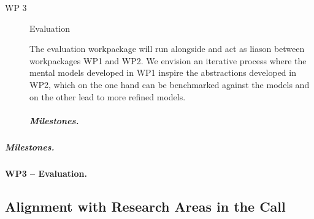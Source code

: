 \documentclass[10pt]{article}
\begin{document}
\begin{description}
\item[WP 3] Evaluation

The evaluation workpackage will run alongside and act as liason between workpackages WP1 and WP2.  
We envision an iterative process where the mental models developed in WP1 inspire the abstractions developed in WP2, which on the one hand can be benchmarked against the models and on the other lead to more refined models. 

\vspace{-\baselineskip}
\subparagraph{Milestones.}


\end{description}



\subparagraph{Milestones.}



\paragraph{WP3 -- Evaluation.}  















\subsection*{Alignment with Research Areas in the Call}
\end{document}
